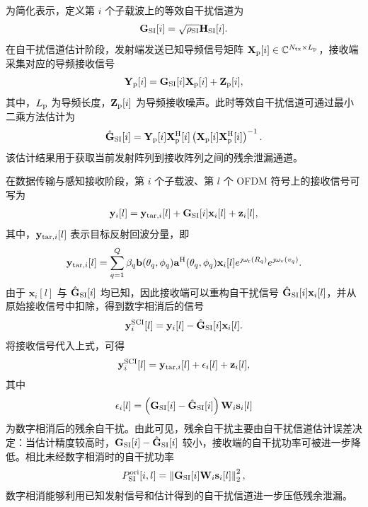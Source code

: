 \documentclass[onecolumn,10pt]{IEEEtran}
\begin{document}
为简化表示，定义第 $i$ 个子载波上的等效自干扰信道为
\begin{align}
    \mathbf{G}_{\rm SI}[i]
    =
    \sqrt{\rho_{\rm SI}}\mathbf{H}_{\rm SI}[i].
\end{align}
在自干扰信道估计阶段，发射端发送已知导频信号矩阵 $\mathbf{X}_{\rm p}[i]\in\mathbb{C}^{N_{\rm tx}\times L_{\rm p}}$，接收端采集对应的导频接收信号
\begin{align}
    \mathbf{Y}_{\rm p}[i]
    =
    \mathbf{G}_{\rm SI}[i]\mathbf{X}_{\rm p}[i]
    +
    \mathbf{Z}_{\rm p}[i],
\end{align}
其中，$L_{\rm p}$ 为导频长度，$\mathbf{Z}_{\rm p}[i]$ 为导频接收噪声。此时等效自干扰信道可通过最小二乘方法估计为
\begin{align}
    \hat{\mathbf{G}}_{\rm SI}[i]
    =
    \mathbf{Y}_{\rm p}[i]\mathbf{X}_{\rm p}^{\rm H}[i]
    \left( \mathbf{X}_{\rm p}[i]\mathbf{X}_{\rm p}^{\rm H}[i] \right)^{-1}.
\end{align}
该估计结果用于获取当前发射阵列到接收阵列之间的残余泄漏通道。

在数据传输与感知接收阶段，第 $i$ 个子载波、第 $l$ 个 OFDM 符号上的接收信号可写为
\begin{align}
    \mathbf{y}_i[l]
    =
    \mathbf{y}_{{\rm tar},i}[l]
    +
    \mathbf{G}_{\rm SI}[i]\mathbf{x}_i[l]
    +
    \mathbf{z}_i[l],
\end{align}
其中，$\mathbf{y}_{{\rm tar},i}[l]$ 表示目标反射回波分量，即
\begin{align}
    \mathbf{y}_{{\rm tar},i}[l]
    =
    \sum_{q=1}^{Q}
    \beta_q
    \mathbf{b}(\theta_q,\phi_q)
    \mathbf{a}^{\rm H}(\theta_q,\phi_q)
    \mathbf{x}_i[l]
    e^{\jmath \omega_{\rm r}(R_q)}
    e^{\jmath \omega_{\rm v}(v_q)}.
\end{align}
由于 $\mathbf{x}_i[l]$ 与 $\hat{\mathbf{G}}_{\rm SI}[i]$ 均已知，因此接收端可以重构自干扰信号 $\hat{\mathbf{G}}_{\rm SI}[i]\mathbf{x}_i[l]$，并从原始接收信号中扣除，得到数字相消后的信号
\begin{align}
    \mathbf{y}_i^{\rm SCI}[l]
    =
    \mathbf{y}_i[l]
    -
    \hat{\mathbf{G}}_{\rm SI}[i]\mathbf{x}_i[l].
\end{align}
将接收信号代入上式，可得
\begin{align}
    \mathbf{y}_i^{\rm SCI}[l]
    =
    \mathbf{y}_{{\rm tar},i}[l]
    +
    \epsilon_i[l]
    +
    \mathbf{z}_i[l],
\end{align}
其中
\begin{align}
    \epsilon_i[l]
    =
    \left( \mathbf{G}_{\rm SI}[i]-\hat{\mathbf{G}}_{\rm SI}[i] \right)
    \mathbf{W}_i\mathbf{s}_i[l]
\end{align}
为数字相消后的残余自干扰。由此可见，残余自干扰主要由自干扰信道估计误差决定：当估计精度较高时，$\mathbf{G}_{\rm SI}[i]-\hat{\mathbf{G}}_{\rm SI}[i]$ 较小，接收端的自干扰功率可被进一步降低。相比未经数字相消时的自干扰功率
\begin{align}
    P_{\rm SI}^{\rm ori}[i,l]
    =
    \left\lVert \mathbf{G}_{\rm SI}[i]\mathbf{W}_i\mathbf{s}_i[l] \right\rVert_2^2,
\end{align}
数字相消能够利用已知发射信号和估计得到的自干扰信道进一步压低残余泄漏。
\end{document}
